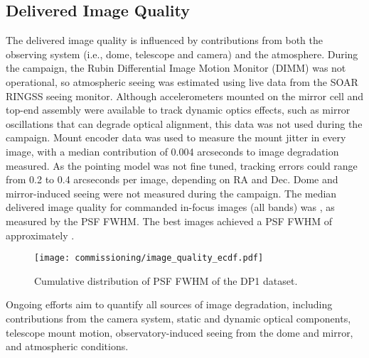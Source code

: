 
\subsection{Delivered Image Quality 
\label{ssec:image_quality}}
The delivered image quality is influenced by contributions from both the observing system (i.e., dome, telescope and camera) and the atmosphere. 
During the campaign, the Rubin Differential Image Motion Monitor (DIMM) was not operational, so atmospheric seeing was estimated using live data from the SOAR RINGSS seeing monitor.
Although accelerometers mounted on the mirror cell and top-end assembly were available to track dynamic optics effects, such as mirror oscillations that can degrade optical alignment, this data was not used during the campaign.
Mount encoder data was used to measure the mount jitter in every image, with a median contribution of 0.004 arcseconds to image degradation measured.
As the pointing model was not fine tuned, tracking errors could range from 0.2 to 0.4 arcseconds per image, depending on RA and Dec.
Dome and mirror-induced seeing were not measured during the campaign.
% 
The median delivered image quality for commanded in-focus images (all bands) was \medianimagequalityallbands, as measured by the PSF FWHM.
The best images achieved a PSF FWHM of approximately \bestimagequality. 
\begin{figure}[htb!]
\centering
\texttt{[image: commissioning/image\_quality\_ecdf.pdf]}
\caption{Cumulative distribution of PSF FWHM of the DP1 dataset.}
\label{fig:delivered_image_quality_ecdf}
\end{figure}
Ongoing efforts aim to quantify all sources of image degradation,  including contributions from the camera system, static and dynamic optical components, telescope mount motion,  observatory-induced seeing from the dome and mirror, and atmospheric conditions.

